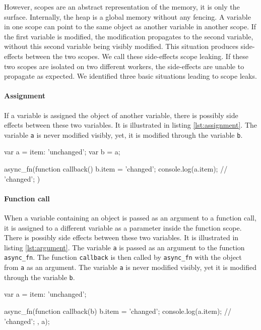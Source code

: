 However, scopes are an abstract representation of the memory, it is only the surface.
Internally, the heap is a global memory without any fencing.
A variable in one scope can point to the same object as another variable in another scope.
If the first variable is modified, the modification propagates to the second variable, without this second variable being visibly modified.
This situation produces side-effects between the two scopes.
We call these side-effects scope leaking.
If these two scopes are isolated on two different workers, the side-effects are unable to propagate as expected.
We identified three basic situations leading to scope leaks.

\paragraph{Assignment}

If a variable is assigned the object of another variable, there is possibly side effects between these two variables.
It is illustrated in listing \ref{lst:assignment}.
The variable \texttt{a} is never modified visibly, yet, it is modified through the variable \texttt{b}.

\begin{code}[js, caption={Example of a scope leak due to assignment},label={lst:assignment}]
var a = {item: 'unchanged'};
var b = a;

async_fn(function callback() {
  b.item = 'changed';
  console.log(a.item); // 'changed';
})
\end{code}

\paragraph{Function call}

When a variable containing an object is passed as an argument to a function call, it is assigned to a different variable as a parameter inside the function scope.
There is possibly side effects between these two variables.
It is illustrated in listing \ref{lst:argument}.
The variable \texttt{a} is passed as an argument to the function \texttt{async\_fn}.
The function \texttt{callback} is then called by \texttt{async\_fn} with the object from \texttt{a} as an argument.
The variable \texttt{a} is never modified visibly, yet it is modified through the variable \texttt{b}.

\begin{code}[js, caption={Example of a scope leak due to a function call},label={lst:argument}]
var a = {item: 'unchanged'};

async_fn(function callback(b) {
  b.item = 'changed';
  console.log(a.item); // 'changed';
}, a);
\end{code}

